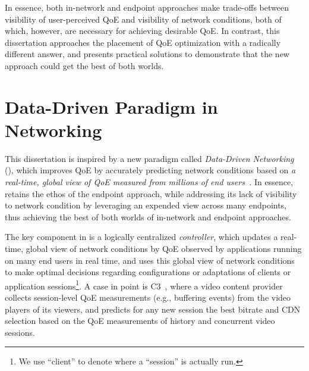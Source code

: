\begin{itemize}
\end{itemize}

In essence, both in-network and endpoint approaches make trade-offs between
visibility of user-perceived QoE and visibility of 
network conditions, both of which, however, are necessary for achieving desirable QoE. 
In contrast, this dissertation approaches the placement of QoE optimization with a radically
different answer, and presents practical solutions to demonstrate that the new approach 
could get the best of both worlds.


\section{Data-Driven Paradigm in Networking}

This dissertation is inspired by a new paradigm called
{\em Data-Driven Networking} ({\em \ddn}), which
improves QoE by accurately predicting network conditions
based on {\em a real-time, global view of QoE measured from millions of 
end users~\cite{ddn-comsnet}.}
In essence, \ddn retains the ethos of the endpoint approach, 
while addressing its lack of
visibility to network condition by leveraging an expended view 
across many endpoints, thus achieving 
the best of both worlds of in-network and endpoint approaches.

The key component in \ddn is a logically centralized 
{\em controller}, which updates a real-time, 
global view of network conditions by 
QoE observed by applications running on 
many end users in real time, and uses this global view of
network conditions  to make  optimal decisions 
regarding configurations or adaptations of clients or application 
sessions\footnote{We use ``client'' to denote where a ``session'' 
is actually run.}.
A case in point is C3~\cite{c3}, where a video content provider 
collects session-level QoE measurements (e.g., buffering events) from 
the video players of its viewers, and predicts for any new session the best
bitrate and CDN selection based on the QoE measurements of 
history and concurrent video sessions.

